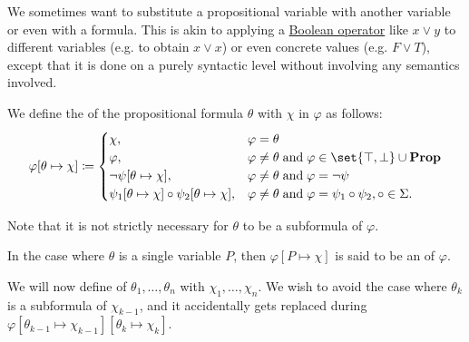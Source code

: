 \begin{definition}\label{def:propositional_substitution}
  We sometimes want to substitute a propositional variable with another variable or even with a formula. This is akin to applying a \hyperref[def:boolean_operator]{Boolean operator} like \( x \vee y \) to different variables (e.g. to obtain \( x \vee x \)) or even concrete values (e.g. \( F \vee T \)), except that it is done on a purely syntactic level without involving any semantics involved.

  \begin{thmenum}
     We define the  of the propositional formula \( \theta \) with \( \chi \) in \( \varphi \) as follows:
    \begin{equation}\label{eq:def:propositional_substitution/single}
      \varphi[\theta \mapsto \chi] \coloneqq \begin{cases}
        \chi,                                                             &\varphi = \theta \\
        \varphi,                                                          &\varphi \neq \theta \T{and} \varphi \in \set{ \top, \bot } \cup \boldop{Prop} \\
        \neg \psi[\theta \mapsto \chi],                                   &\varphi \neq \theta \T{and} \varphi = \neg \psi \\
        \psi_1[\theta \mapsto \chi] \bincirc \psi_2[\theta \mapsto \chi], &\varphi \neq \theta \T{and} \varphi = \psi_1 \bincirc \psi_2, \circ \in \Sigma.
      \end{cases}
    \end{equation}

    Note that it is not strictly necessary for \( \theta \) to be a subformula of \( \varphi \).

    In the case where \( \theta \) is a single variable \( P \), then \( \varphi[P \mapsto \chi] \) is said to be an  of \( \varphi \).

     We will now define  of \( \theta_1, \ldots, \theta_n \) with \( \chi_1, \ldots, \chi_n \). We wish to avoid the case where \( \theta_k \) is a subformula of \( \chi_{k-1} \), and it accidentally gets replaced during \( \varphi[\theta_{k-1} \mapsto \chi_{k-1}][\theta_k \mapsto \chi_k] \).


\end{thmenum}
\end{definition}
